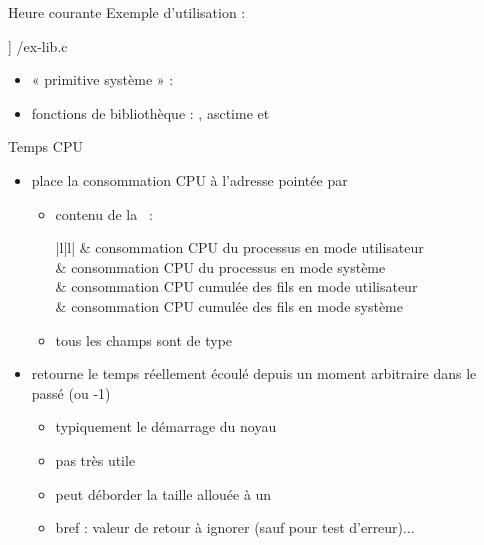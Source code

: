 \begin {frame} {Heure courante}
    Exemple d'utilisation :

    \fD\lstmonstyle] {\inc/ex-lib.c}

    \begin {itemize}
	\item « primitive système » : 
	\item fonctions de bibliothèque : , \code
	    {asctime} et 
    \end {itemize}
\end {frame}



\begin {frame} {Temps CPU}

    \begin {itemize}
	\item place la consommation CPU à l'adresse pointée par 
	    \begin {itemize}
		\item contenu de la ~:

		    \vspace* {-3mm}

		    \ctableau {\fD} {|l|l|} {
			    & consommation CPU du processus
				en mode utilisateur \\
			    & consommation CPU du processus
				en mode système \\
			    & consommation CPU cumulée des fils
				en mode utilisateur \\
			    & consommation CPU cumulée des fils
				en mode système \\
		    }

		    \vspace* {1mm}

		\item tous les champs sont de type 
	    \end {itemize}

	\item retourne le temps réellement écoulé depuis un moment
	    arbitraire dans le passé (ou -1)

	    \begin {itemize}
		\item typiquement le démarrage du noyau
		\item pas très utile
		\item peut déborder la taille allouée à un 
		\item bref : valeur de retour à ignorer (sauf pour test
		    d'erreur)...
	    \end {itemize}

    \end {itemize}
\end {frame}

